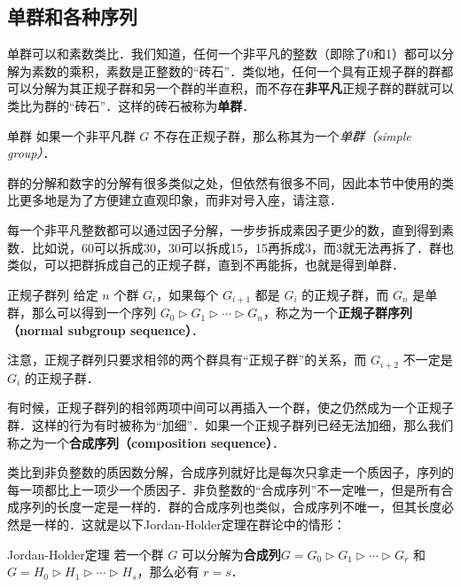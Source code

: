 

\subsection{单群和各种序列}

单群可以和素数类比．我们知道，任何一个非平凡的整数（即除了0和1）都可以分解为素数的乘积，素数是正整数的“砖石”．类似地，任何一个具有正规子群的群都可以分解为其正规子群和另一个群的半直积，而不存在\textbf{非平凡}正规子群的群就可以类比为群的“砖石”．这样的砖石被称为\textbf{单群}．

\begin{definition}{单群}
如果一个非平凡群 $G$ 不存在正规子群，那么称其为一个\emph{单群（simple group）}．
\end{definition}

群的分解和数字的分解有很多类似之处，但依然有很多不同，因此本节中使用的类比更多地是为了方便建立直观印象，而非对号入座，请注意．

每一个非平凡整数都可以通过因子分解，一步步拆成素因子更少的数，直到得到素数．比如说，60可以拆成30，30可以拆成15，15再拆成3，而3就无法再拆了．群也类似，可以把群拆成自己的正规子群，直到不再能拆，也就是得到单群．

\begin{definition}{正规子群列}
给定 $n$ 个群 $G_i$，如果每个 $G_{i+1}$ 都是 $G_{i}$ 的正规子群，而 $G_n$ 是单群，那么可以得到一个序列 $G_0\triangleright G_1\triangleright\cdots\triangleright G_n$，称之为一个\textbf{正规子群序列（normal subgroup sequence）}．
\end{definition}

注意，正规子群列只要求相邻的两个群具有“正规子群”的关系，而 $G_{i+2}$ 不一定是 $G_i$ 的正规子群．

有时候，正规子群列的相邻两项中间可以再插入一个群，使之仍然成为一个正规子群．这样的行为有时被称为“加细”．如果一个正规子群列已经无法加细，那么我们称之为一个\textbf{合成序列（composition sequence）}．

类比到非负整数的质因数分解，合成序列就好比是每次只拿走一个质因子，序列的每一项都比上一项少一个质因子．非负整数的“合成序列”不一定唯一，但是所有合成序列的长度一定是一样的．群的合成序列也类似，合成序列不唯一，但其长度必然是一样的．这就是以下Jordan-Holder定理在群论中的情形：

\begin{definition}{Jordan-Holder定理}
若一个群 $G$ 可以分解为\textbf{合成列}$G=G_0\triangleright G_1\triangleright\cdots\triangleright G_r$ 和 $G=H_0\triangleright H_1\triangleright\cdots\triangleright H_s$，那么必有 $r=s$．
\end{definition}


